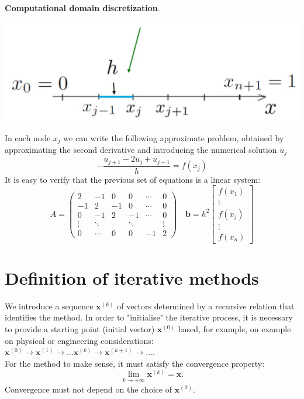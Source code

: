 \documentclass[11pt]{book}
\begin{document}
\textbf{Computational domain discretization}.
\begin{center}
\includegraphics[max width=\textwidth]{2023_09_05_b72ccc85584d9dc6fb5cg-032}
\end{center}
In each node $x_{j}$ we can write the following approximate problem, obtained by approximating the second
derivative and introducing the numerical solution $u_{j}$
$$
-\frac{u_{j+1}-2 u_{j}+u_{j-1}}{h}=f\left(x_{j}\right)
$$
It is easy to verify that the previous set of equations is a linear system:
$$
A=\left(\begin{array}{cccccc}
2 & -1 & 0 & 0 & \cdots & 0 \\
-1 & 2 & -1 & 0 & \cdots & 0 \\
0 & -1 & 2 & -1 & \cdots & 0 \\
\vdots & \ddots & & \ddots & & \vdots \\
0 & \cdots & 0 & 0 & -1 & 2
\end{array}\right) \quad \mathbf{b}=h^{2}\left[\begin{array}{c}
f\left(x_{1}\right) \\
\vdots \\
f\left(x_{j}\right) \\
\vdots \\
f\left(x_{n}\right)
\end{array}\right]
$$

\section*{Definition of iterative methods}

We introduce a sequence $\mathbf{x}^{(k)}$ of vectors determined by a recursive relation that identifies the method.
In order to "initialise" the iterative process, it is necessary to provide a starting point (initial vector) $\mathbf{x}^{(0)}$ based, for example, on example on physical or engineering considerations: $\mathbf{x}^{(0)} \longrightarrow \mathbf{x}^{(1)} \longrightarrow \ldots \mathbf{x}^{(k)} \longrightarrow \mathbf{x}^{(k+1)} \longrightarrow \ldots$. \\
For the method to make sense, it must satisfy the convergence property:
$$
\lim _{k \rightarrow+\infty} \mathbf{x}^{(k)}=\mathbf{x}.
$$
Convergence must not depend on the choice of $\mathbf{x}^{(0)}$.
\end{document}
